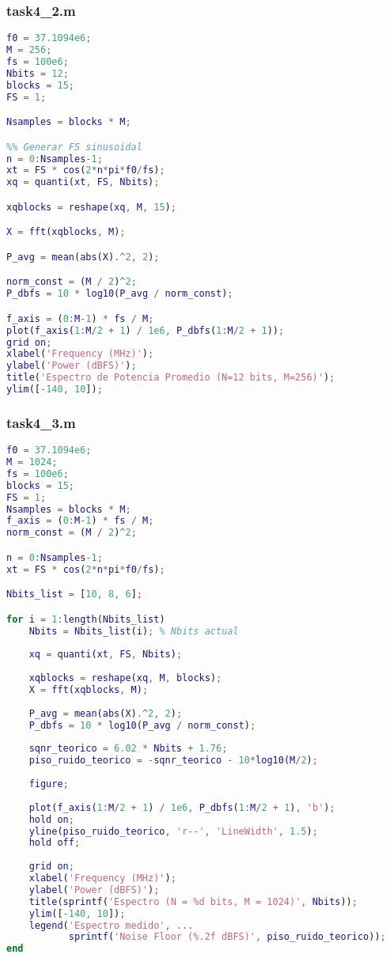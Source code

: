 \subsubsection{task4\_2.m}
\begin{lstlisting}[language=Matlab]
f0 = 37.1094e6;
M = 256;
fs = 100e6;
Nbits = 12;
blocks = 15;
FS = 1;

Nsamples = blocks * M;

%% Generar FS sinusoidal
n = 0:Nsamples-1;
xt = FS * cos(2*n*pi*f0/fs);
xq = quanti(xt, FS, Nbits);

xqblocks = reshape(xq, M, 15);

X = fft(xqblocks, M);

P_avg = mean(abs(X).^2, 2);

norm_const = (M / 2)^2;
P_dbfs = 10 * log10(P_avg / norm_const);

f_axis = (0:M-1) * fs / M;
plot(f_axis(1:M/2 + 1) / 1e6, P_dbfs(1:M/2 + 1));
grid on;
xlabel('Frequency (MHz)');
ylabel('Power (dBFS)');
title('Espectro de Potencia Promedio (N=12 bits, M=256)');
ylim([-140, 10]);
\end{lstlisting}


\subsubsection{task4\_3.m}
\begin{lstlisting}[language=Matlab]
f0 = 37.1094e6;
M = 1024;
fs = 100e6;
blocks = 15;
FS = 1;
Nsamples = blocks * M;
f_axis = (0:M-1) * fs / M;
norm_const = (M / 2)^2; 

n = 0:Nsamples-1;
xt = FS * cos(2*n*pi*f0/fs);

Nbits_list = [10, 8, 6];

for i = 1:length(Nbits_list)
    Nbits = Nbits_list(i); % Nbits actual
    
    xq = quanti(xt, FS, Nbits);
    
    xqblocks = reshape(xq, M, blocks);
    X = fft(xqblocks, M);
    
    P_avg = mean(abs(X).^2, 2);
    P_dbfs = 10 * log10(P_avg / norm_const);
    
    sqnr_teorico = 6.02 * Nbits + 1.76;
    piso_ruido_teorico = -sqnr_teorico - 10*log10(M/2);
    
    figure;
    
    plot(f_axis(1:M/2 + 1) / 1e6, P_dbfs(1:M/2 + 1), 'b');
    hold on;
    yline(piso_ruido_teorico, 'r--', 'LineWidth', 1.5);
    hold off;
    
    grid on;
    xlabel('Frequency (MHz)');
    ylabel('Power (dBFS)');
    title(sprintf('Espectro (N = %d bits, M = 1024)', Nbits));
    ylim([-140, 10]);
    legend('Espectro medido', ...
           sprintf('Noise Floor (%.2f dBFS)', piso_ruido_teorico));
end
\end{lstlisting}


